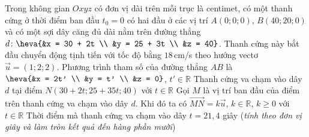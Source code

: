 \begin{ex} %
	Trong không gian $Oxyz$ có đơn vị dài trên mỗi trục là centimet, có một thanh cứng ở thời điểm ban đầu $t_0 = 0$ có hai đầu ở các vị trí $A(0;0;0)$, $B(40;20;0)$ và có một sợi dây căng đủ dài nằm trên đường thẳng $d \colon \heva{&x = 30 + 2t \\ &y = 25 + 3t \\ &z = 40}$. Thanh cứng này bắt đầu chuyển động tịnh tiến với tốc độ bằng $18$\,cm/s theo hướng vectơ $\overrightarrow{u} = (1;2;2)$.
	\choiceTF
	{\True Phương trình tham số của đường thẳng $AB$ là $\heva{&x = 2t' \\ &y = t' \\ &z = 0}$, $t' \in \mathbb{R}$}
	{Thanh cứng va chạm vào dây $d$ tại điểm $N(30 + 2t; 25 + 35t; 40)$ với $t \in \mathbb{R}$}
	{\True Gọi $M$ là vị trí ban đầu của điểm trên thanh cứng va chạm vào dây $d$. Khi đó ta có $\overrightarrow{MN} = k\overrightarrow{u}$, $k \in \mathbb{R}$, $k \ge 0$ với $t \in \mathbb{R}$}
	{Thời điểm mà thanh cứng va chạm vào dây $t = 21{,}4$ giây (\textit{tính theo đơn vị giây và làm tròn kết quả đến hàng phần mười})}
\end{ex}
